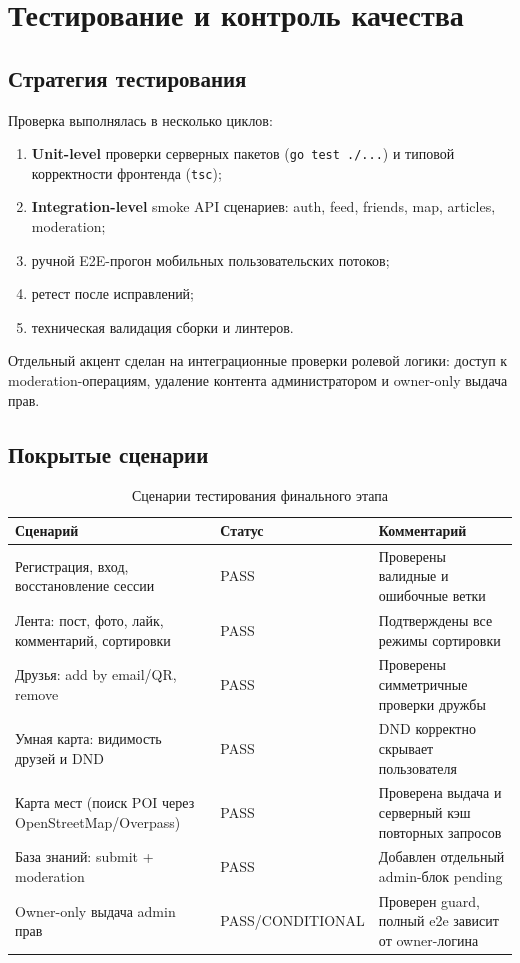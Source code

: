 \documentclass[12pt,a4paper]{article}
\newcommand{\code}[1]{{\small\texttt{#1}}}
\begin{document}
\section{Тестирование и контроль качества}

\subsection{Стратегия тестирования}

Проверка выполнялась в несколько циклов:
\begin{enumerate}
  \item \textbf{Unit-level} проверки серверных пакетов (\code{go test ./...}) и типовой корректности фронтенда (\code{tsc});
  \item \textbf{Integration-level} smoke API сценариев: auth, feed, friends, map, articles, moderation;
  \item ручной E2E-прогон мобильных пользовательских потоков;
  \item ретест после исправлений;
  \item техническая валидация сборки и линтеров.
\end{enumerate}

Отдельный акцент сделан на интеграционные проверки ролевой логики: доступ к moderation-операциям, удаление контента администратором и owner-only выдача прав.

\subsection{Покрытые сценарии}

\begin{table}[H]
\centering
\small
\caption{Сценарии тестирования финального этапа}
\begin{tabular}{|L{0.5\textwidth}|L{0.14\textwidth}|L{0.26\textwidth}|}
\hline
\textbf{Сценарий} & \textbf{Статус} & \textbf{Комментарий} \\
\hline
Регистрация, вход, восстановление сессии & PASS & Проверены валидные и ошибочные ветки \\
\hline
Лента: пост, фото, лайк, комментарий, сортировки & PASS & Подтверждены все режимы сортировки \\
\hline
Друзья: add by email/QR, remove & PASS & Проверены симметричные проверки дружбы \\
\hline
Умная карта: видимость друзей и DND & PASS & DND корректно скрывает пользователя \\
\hline
Карта мест (поиск POI через OpenStreetMap/Overpass) & PASS & Проверена выдача и серверный кэш повторных запросов \\
\hline
База знаний: submit + moderation & PASS & Добавлен отдельный admin-блок pending \\
\hline
Owner-only выдача admin прав & PASS/CONDITIONAL & Проверен guard, полный e2e зависит от owner-логина \\
\hline
\end{tabular}
\end{table}
\end{document}
